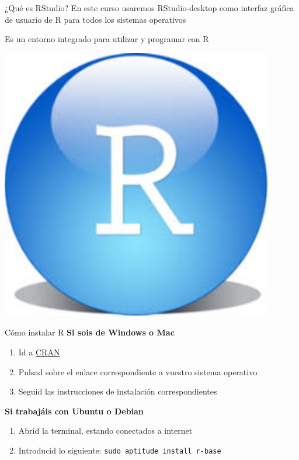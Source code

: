 \documentclass[
  ignorenonframetext,
]{beamer}
\providecommand{\tightlist}{%
  \setlength{\itemsep}{0pt}\setlength{\parskip}{0pt}}
\begin{document}
\begin{frame}{¿Qué es RStudio?}
\label{quuxe9-es-rstudio}
En este curso usaremos RStudio-desktop como interfaz gráfica de usuario
de R para todos los sistemas operativos

Es un entorno integrado para utilizar y programar con R

\begin{center}\includegraphics[width=450px]{Imgs/RSLogo} \end{center}
\end{frame}

\begin{frame}[fragile]{Cómo instalar R}
\label{cuxf3mo-instalar-r}
\textbf{Si sois de Windows o Mac}

\begin{enumerate}
\tightlist
\item
  Id a \href{http://cran.r-project.org/}{CRAN}
\item
  Pulsad sobre el enlace correspondiente a vuestro sistema operativo
\item
  Seguid las instrucciones de instalación correspondientes
\end{enumerate}

\textbf{Si trabajáis con Ubuntu o Debian}

\begin{enumerate}
\tightlist
\item
  Abrid la terminal, estando conectados a internet
\item
  Introducid lo siguiente: \texttt{sudo\ aptitude\ install\ r-base}
\end{enumerate}
\end{frame}
\end{document}
